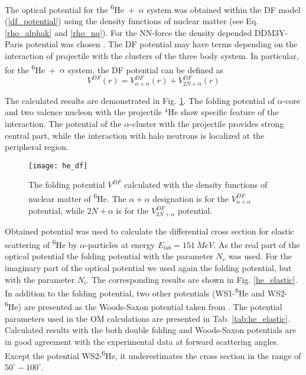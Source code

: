 \documentclass[
12pt, %
oneside, %
english, %
doublespacing, %
doublespacing, %
toctotoc, %
parskip, %
headsepline, %
]{MastersDoctoralThesis} %
\newcommand{\he}{\textsuperscript{6}He\xspace}
\begin{document}
The optical potential for the \he~+~$\alpha$ system was obtained within the DF model (\ref{df_potential}) using  the density functions of nuclear matter (see Eq. \ref{rho_alphak} and \ref{rho_nq}). For the NN-force the density depended DDM3Y-Paris potential was chosen \cite{anantaraman1983effective}. The DF potential may have terms depending on the interaction of projectile with the clusters of the three body system. In particular, for the \he~+~$\alpha$ system, the DF potential can be defined as
\begin{equation}
V^{DF}({ r})=V^{DF}_{\alpha+\alpha}({ r})+V^{DF}_{2N+\alpha}({ r})
\label{df_in_terms}
\end{equation}


The calculated results are demonstrated in Fig. \ref{he_df}. The folding potential of $\alpha$-core and two valence nucleon with the projectile $^4$He show specific feature of the interaction.
The potential of the $\alpha$-cluster with the projectile provides strong central part, while the interaction with halo neutrons is localized at the peripheral region.

\begin{figure}[h!]
\centering
\texttt{[image: he\_df]}
\decoRule
\caption{The folding potential $V^{DF}$ calculated with the density functions of nuclear matter of \he. The $\alpha+\alpha$ designation is for the $V_{\alpha+\alpha}^{DF}$ potential, while $2N + \alpha$ is for the  $V_{2N+\alpha}^{DF}$ potential.}
\label{he_df}
\end{figure}

Obtained potential was used to calculate the differential cross section for elastic scattering of \he by $\alpha$-particles at energy $ E_{lab} = 151~MeV$. As the real part of the optical potential the folding potential with the parameter $N_r$ was used. For the imaginary part of the optical potential we used again the folding potential, but with the parameter $N_i$.
The corresponding results are shown in Fig. \ref{he_elastic}. 
In addition to the folding potential, two other potentials (WS1-\he and WS2-\he) are presented as the Woods-Saxon potential taken from \cite{oganessian1999dynamics}.
 The potential parameters used in the OM calculations are presented in Tab. \ref{tab:he_elastic}.
Calculated results with the both double folding and Woods-Saxon potentials are in good agreement with the experimental data at forward scattering angles.
Except the potential WS2-\he, it underestimates the cross section in the range of $50^\circ-100^\circ$.
\end{document}
